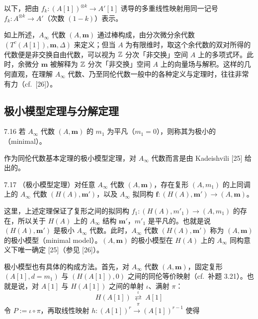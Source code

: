 以下，把由 $f_{k}\colon(A[1])^{\otimes k}\to A'[1]$ 诱导的多重线性映射用同一记号 $f_{k}\colon A^{\otimes k}\to A'$（次数 $(1-k)$）表示。

如上所述，$A_\infty$ 代数 $(A,\mathbf m)$ 通过棒构成，由分次微分余代数 $(T^{c}(A[1]),\mathbf m,\Delta)$ 来定义；但当 $A$ 为有限维时，取这个余代数的双对所得的代数便是非交换自由代数，可以视为 $\mathbb{Z}$ 分次「非交换」空间 $A$ 上的多项式环。此时，余微分 $\mathbf m$ 被解释为 $\mathbb{Z}$ 分次「非交换」空间 $A$ 上的向量场与解积。这样的几何直观，在理解 $A_\infty$ 代数、乃至同伦代数一般中的各种定义与定理时，往往非常有力（cf.\ [26]）。


\subsection{极小模型定理与分解定理}

\begin{definition}{7.16}
若 $A_\infty$ 代数 $(A,\mathbf m)$ 的 $m_{1}$ 为平凡（$m_{1}=0$），则称其为极小的（minimal）。
\end{definition}

作为同伦代数基本定理的极小模型定理，对 $A_\infty$ 代数而言是由 Kadeishvili [25] 给出的。

\begin{theorem}{7.17}
（极小模型定理）对任意 $A_\infty$ 代数 $(A,\mathbf m)$，存在复形 $(A,m_{1})$ 的上同调上的 $A_\infty$ 代数 $(H(A),\mathbf m')$，以及 $A_\infty$ 拟同构 $\mathbf f\colon(H(A),\mathbf m')\to(A,\mathbf m)$。
\end{theorem}

这里，上述定理保证了复形之间的拟同构 $f_{1}\colon(H(A),m'_{1})\to(A,m_{1})$ 的存在，所以关于 $H(A)$ 上的 $A_\infty$ 结构 $\mathbf m'$，$m'_{1}$ 是平凡的。也就是说 $(H(A),\mathbf m')$ 是极小 $A_\infty$ 代数。此时，$A_\infty$ 代数 $(H(A),\mathbf m')$ 称为 $(A,\mathbf m)$ 的极小模型（minimal model）。$(A,\mathbf m)$ 的极小模型在 $H(A)$ 上的 $A_\infty$ 同构意义下唯一确定 [25]（参见 [26]）。

极小模型也有具体的构成方法。首先，对 $A_\infty$ 代数 $(A,\mathbf m)$，固定复形 $(A[1],d=m_{1})$ 与 $(H(A[1]),0)$ 之间的同伦等价映射（cf.\ 补题 3.21）。也就是说，对 $A[1]$ 与 $H(A[1])$ 之间的单射 $\iota$、满射 $\pi$：
\begin{equation}
  H(A[1])\ \underset{\pi}{\overset{\iota}{\rightleftarrows}}\ A[1] \tag{7.5}
\end{equation}
令 $P:=\iota\circ\pi$，再取线性映射 $h\colon(A[1])^{r}\to(A[1])^{r-1}$ 使得

